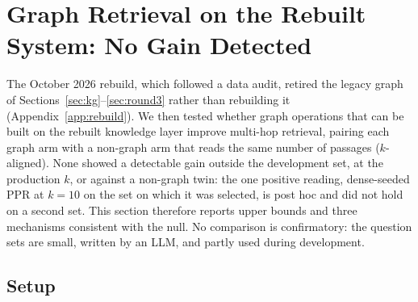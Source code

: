 
\section{Graph Retrieval on the Rebuilt System: No Gain Detected}
\label{sec:rebuiltgraph}

The October 2026 rebuild, which followed a data audit, retired the legacy
graph of Sections~\ref{sec:kg}--\ref{sec:round3} rather than rebuilding it
(Appendix~\ref{app:rebuild}). We then tested whether graph operations
that can be built on the rebuilt knowledge layer improve multi-hop
retrieval, pairing each graph arm with a non-graph arm that reads the same
number of passages ($k$-aligned). None showed a detectable gain outside
the development set, at the production $k$, or against a non-graph twin:
the one positive reading, dense-seeded PPR at $k=10$ on the set on which
it was selected, is post hoc and did not hold on a second set. This
section therefore reports upper bounds and three mechanisms consistent
with the null. No comparison is
confirmatory: the question sets are small, written by an LLM, and partly
used during development.

\subsection{Setup}
\label{sec:rebuiltsetup}

